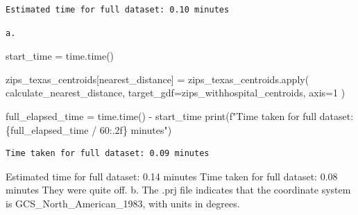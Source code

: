 \documentclass[
  letterpaper,
  DIV=11,
  numbers=noendperiod]{scrartcl}
\newenvironment{Shaded}{\begin{snugshade}}{\end{snugshade}}
\newcommand{\BuiltInTok}[1]{\textcolor[rgb]{0.00,0.23,0.31}{#1}}
\newcommand{\DecValTok}[1]{\textcolor[rgb]{0.68,0.00,0.00}{#1}}
\newcommand{\NormalTok}[1]{\textcolor[rgb]{0.00,0.23,0.31}{#1}}
\newcommand{\OperatorTok}[1]{\textcolor[rgb]{0.37,0.37,0.37}{#1}}
\newcommand{\SpecialCharTok}[1]{\textcolor[rgb]{0.37,0.37,0.37}{#1}}
\newcommand{\SpecialStringTok}[1]{\textcolor[rgb]{0.13,0.47,0.30}{#1}}
\newcommand{\StringTok}[1]{\textcolor[rgb]{0.13,0.47,0.30}{#1}}
\begin{document}
\begin{verbatim}
Estimated time for full dataset: 0.10 minutes
\end{verbatim}

\begin{verbatim}
a.
\end{verbatim}

\begin{Shaded}
\begin{Highlighting}[]
\NormalTok{start\_time }\OperatorTok{=}\NormalTok{ time.time()}

\NormalTok{zips\_texas\_centroids[}\StringTok{\textquotesingle{}nearest\_distance\textquotesingle{}}\NormalTok{] }\OperatorTok{=}\NormalTok{ zips\_texas\_centroids.}\BuiltInTok{apply}\NormalTok{(}
\NormalTok{calculate\_nearest\_distance, target\_gdf}\OperatorTok{=}\NormalTok{zips\_withhospital\_centroids, axis}\OperatorTok{=}\DecValTok{1}
\NormalTok{)}

\NormalTok{full\_elapsed\_time }\OperatorTok{=}\NormalTok{ time.time() }\OperatorTok{{-}}\NormalTok{ start\_time}
\BuiltInTok{print}\NormalTok{(}\SpecialStringTok{f"Time taken for full dataset: }\SpecialCharTok{\{}\NormalTok{full\_elapsed\_time }\OperatorTok{/} \DecValTok{60}\SpecialCharTok{:.2f\}}\SpecialStringTok{ minutes"}\NormalTok{)}
\end{Highlighting}
\end{Shaded}

\begin{verbatim}
Time taken for full dataset: 0.09 minutes
\end{verbatim}

Estimated time for full dataset: 0.14 minutes Time taken for full
dataset: 0.08 minutes They were quite off. b. The .prj file indicates
that the coordinate system is GCS\_North\_American\_1983, with units in
degrees.
\end{document}

